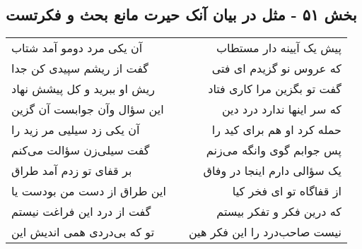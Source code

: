 \begin{center}
\section*{بخش ۵۱ - مثل در بیان آنک حیرت مانع بحث و فکرتست}
\label{sec:sh051}
\begin{longtable}{l p{0.5cm} r}
آن یکی مرد دومو آمد شتاب
&&
پیش یک آیینه دار مستطاب
\\
گفت از ریشم سپیدی کن جدا
&&
که عروس نو گزیدم ای فتی
\\
ریش او ببرید و کل پیشش نهاد
&&
گفت تو بگزین مرا کاری فتاد
\\
این سؤال وآن جوابست آن گزین
&&
که سر اینها ندارد درد دین
\\
آن یکی زد سیلیی مر زید را
&&
حمله کرد او هم برای کید را
\\
گفت سیلی‌زن سؤالت می‌کنم
&&
پس جوابم گوی وانگه می‌زنم
\\
بر قفای تو زدم آمد طراق
&&
یک سؤالی دارم اینجا در وفاق
\\
این طراق از دست من بودست یا
&&
از قفاگاه تو ای فخر کیا
\\
گفت از درد این فراغت نیستم
&&
که درین فکر و تفکر بیستم
\\
تو که بی‌دردی همی اندیش این
&&
نیست صاحب‌درد را این فکر هین
\\
\end{longtable}
\end{center}
